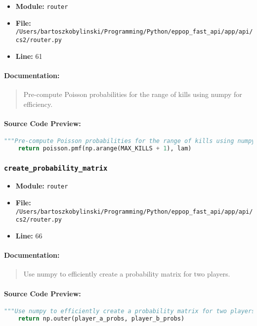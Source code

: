 \documentclass[11pt,a4paper]{article}
\begin{document}
\begin{itemize}
    \item \textbf{Module:} \texttt{router}
    \item \textbf{File:} \texttt{/Users/bartoszkobylinski/Programming/Python/eppop\_fast\_api/app/api/cs2/router.py}
    \item \textbf{Line:} 61
\end{itemize}

\paragraph{Documentation:}
\begin{quote}
Pre-compute Poisson probabilities for the range of kills using numpy for efficiency.
\end{quote}

\paragraph{Source Code Preview:}
\begin{lstlisting}[language=Python]
    """Pre-compute Poisson probabilities for the range of kills using numpy for efficiency."""
    return poisson.pmf(np.arange(MAX_KILLS + 1), lam)
\end{lstlisting}

\vspace{1em}
\subsubsection{\texttt{create\_probability\_matrix}}

\begin{itemize}
    \item \textbf{Module:} \texttt{router}
    \item \textbf{File:} \texttt{/Users/bartoszkobylinski/Programming/Python/eppop\_fast\_api/app/api/cs2/router.py}
    \item \textbf{Line:} 66
\end{itemize}

\paragraph{Documentation:}
\begin{quote}
Use numpy to efficiently create a probability matrix for two players.
\end{quote}

\paragraph{Source Code Preview:}
\begin{lstlisting}[language=Python]
    """Use numpy to efficiently create a probability matrix for two players."""
    return np.outer(player_a_probs, player_b_probs)
\end{lstlisting}
\end{document}
